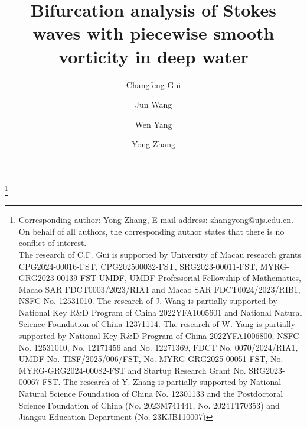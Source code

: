 \documentclass[11pt,reqno]{amsart}
\numberwithin{equation}{section}
\theoremstyle{definition}
\theoremstyle{remark}
\begin{document}
\title[Bifurcation analysis of Stokes waves with piecewise smooth vorticity in deep water]
{Bifurcation analysis of Stokes waves with piecewise smooth
vorticity in deep water}

\author[C.-F. Gui]{Changfeng Gui}
\address{\noindent Changfeng ~Gui,~Department of Mathematics, Faculty of Science and Technology, University of Macau, Taipa, Macau,
China.} 


\author[J. Wang]{Jun Wang}
\address{\noindent Jun ~Wang,~School of Mathematical Sciences, Jiangsu University,
    Zhenjiang, Jiangsu, 212013, P.R. China.}


\author[W. Yang]{Wen Yang}
\address{\noindent Wen ~Yang,~Department of Mathematics, Faculty of Science and Technology,
University of Macau, Taipa, Macau, P.R. China}


\author[Y. Zhang]{Yong Zhang}
\address{\noindent Yong ~Zhang,~School of Mathematical Sciences, Jiangsu University, Zhenjiang, 212013, P.R. China.}




\thanks{Corresponding author: Yong Zhang, E-mail address: zhangyong@ujs.edu.cn. On behalf of all authors, the corresponding author states that there is no conflict of interest. \\
The research of C.F. Gui is supported by University of Macau research grants CPG2024-00016-FST, CPG202500032-FST, SRG2023-00011-FST, MYRG-GRG2023-00139-FST-UMDF, UMDF Professorial Fellowship of Mathematics, Macao SAR FDCT0003/2023/RIA1 and Macao SAR FDCT0024/2023/RIB1, NSFC No. 12531010. The research of
J. Wang is partially supported by National Key R$\&$D Program of
China 2022YFA1005601 and National Natural Science Foundation of
China 12371114. The research of W. Yang is partially supported by National
Key R\&D Program of China 2022YFA1006800, NSFC No. 12531010, No.
12171456 and No. 12271369, FDCT No. 0070/2024/RIA1, UMDF No. TISF/2025/006/FST, No. MYRG-GRG2025-00051-FST, No. MYRG-GRG2024-00082-FST and Startup
Research Grant No. SRG2023-00067-FST. The research of
Y. Zhang is partially supported by National Natural Science
Foundation of China No. 12301133 and the Postdoctoral Science
Foundation of China (No. 2023M741441, No. 2024T170353) and Jiangsu
Education Department (No. 23KJB110007)}
\end{document}

